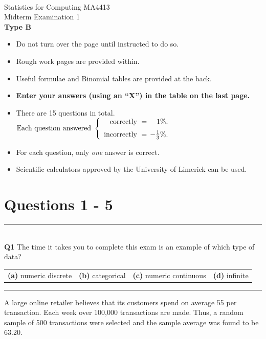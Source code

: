 \documentclass[12pt]{article}
\begin{document}
\quad\\[2cm]

\begin{center}
{\Huge Statistics for Computing MA4413\\[0.8cm]
Midterm Examination 1\\[1cm]
{\bf Type B}}\\[2cm]
\end{center}

\begin{itemize}\itemsep0.6cm
\item Do not turn over the page until instructed to do so.
\item Rough work pages are provided within.
\item Useful formulae and Binomial tables are provided at the back.
\item {\bf Enter your answers (using an ``X'') in the table on the last page.}
\item There are 15 questions in total.
$
\text{Each question answered } \left\{\begin{array}{rr}
\text{correctly } = & \hspace{-0.2cm}1\%. \\[0.2cm]
\text{incorrectly } = & \hspace{-0.2cm}-\tfrac{1}{3}\%.
\end{array}\right.
$
\item For each question, only \emph{one} answer is correct.
\item Scientific calculators approved by the University of Limerick can be used.
\end{itemize}

\newpage
\section*{Questions 1 - 5}

\rule{\linewidth}{1pt}
\quad\\
{\bf Q1} The time it takes you to complete this exam is an example of which type of data?\\[0.2cm]
\begin{tabular}{cccc}
{\bf(a)} numeric discrete & {\bf(b)} categorical  & {\bf(c)} numeric continuous & {\bf(d)} infinite\\[0.6cm]
\end{tabular}


\rule{\linewidth}{1pt}
\quad

A large online retailer believes that its customers spend on average {\sffamily\texteuro}55 per transaction. Each week over 100,000 transactions are made. Thus, a random sample of 500 transactions were selected and the sample average was found to be {\sffamily\texteuro}63.20.\\[0.3cm]
\end{document}
